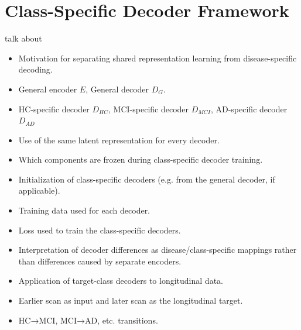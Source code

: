 \section{Class-Specific Decoder Framework}
talk about
\begin{itemize}
    \item Motivation for separating shared representation learning from disease-specific decoding.
    \item General encoder $E$, General decoder $D_G$.
    \item HC-specific decoder $D_{HC}$, MCI-specific decoder $D_{MCI}$, AD-specific decoder $D_{AD}$
    \item Use of the same latent representation for every decoder.
    \item Which components are frozen during class-specific decoder training.
    \item Initialization of class-specific decoders (e.g. from the general decoder, if applicable).
    \item Training data used for each decoder.
    \item Loss used to train the class-specific decoders.
    \item Interpretation of decoder differences as disease/class-specific mappings rather than differences caused by separate encoders.
    \item Application of target-class decoders to longitudinal data.
    \item Earlier scan as input and later scan as the longitudinal target.
    \item HC→MCI, MCI→AD, etc. transitions.
\end{itemize}